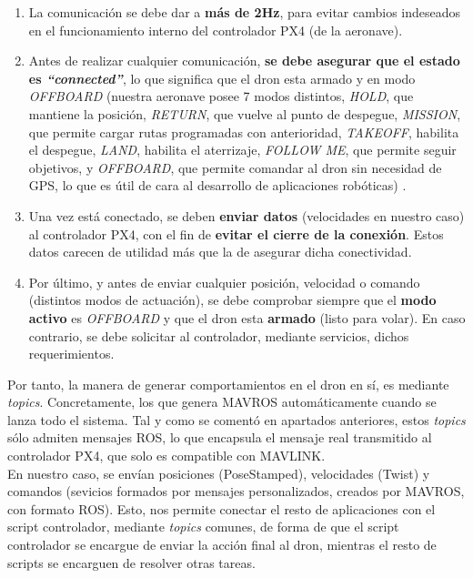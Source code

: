 \begin{enumerate}
	\item La comunicación se debe dar a \textbf{más de 2Hz}, para evitar cambios indeseados en el funcionamiento interno del controlador PX4 (de la aeronave).

	\item Antes de realizar cualquier comunicación, \textbf{se debe asegurar que el estado es \emph{``connected''}}, lo que significa que el dron esta armado y en modo \emph{OFFBOARD} (nuestra aeronave posee 7 modos distintos, \emph{HOLD}, que mantiene la posición, \emph{RETURN}, que vuelve al punto de despegue, \emph{MISSION}, que permite cargar rutas programadas con anterioridad, \emph{TAKEOFF}, habilita el despegue, \emph{LAND}, habilita el aterrizaje, \emph{FOLLOW ME}, que permite seguir objetivos, y \emph{OFFBOARD}, que permite comandar al dron sin necesidad de GPS, lo que es útil de cara al desarrollo de aplicaciones robóticas) \cite{flight-modes}.

    \item Una vez está conectado, se deben \textbf{enviar datos} (velocidades en nuestro caso) al controlador PX4, con el fin de \textbf{evitar el cierre de la conexión}. Estos datos carecen de utilidad más que la de asegurar dicha conectividad.

    \item Por último, y antes de enviar cualquier posición, velocidad o comando (distintos modos de actuación), se debe comprobar siempre que el \textbf{modo activo} es \emph{OFFBOARD} y que el dron esta \textbf{armado} (listo para volar). En caso contrario, se debe solicitar al controlador, mediante servicios, dichos requerimientos.
\end{enumerate}

Por tanto, la manera de generar comportamientos en el dron en sí, es mediante \emph{topics}. Concretamente, los que genera MAVROS automáticamente cuando se lanza todo el sistema. Tal y como se comentó en apartados anteriores, estos \emph{topics} sólo admiten mensajes \ac{ROS}, lo que encapsula el mensaje real transmitido al controlador PX4, que solo es compatible con MAVLINK.\\

En nuestro caso, se envían posiciones (PoseStamped), velocidades (Twist) y comandos (sevicios formados por mensajes personalizados, creados por MAVROS, con formato \ac{ROS}). Esto, nos permite conectar el resto de aplicaciones con el script controlador, mediante \emph{topics} comunes, de forma de que el script controlador se encargue de enviar la acción final al dron, mientras el resto de scripts se encarguen de resolver otras tareas.\\

